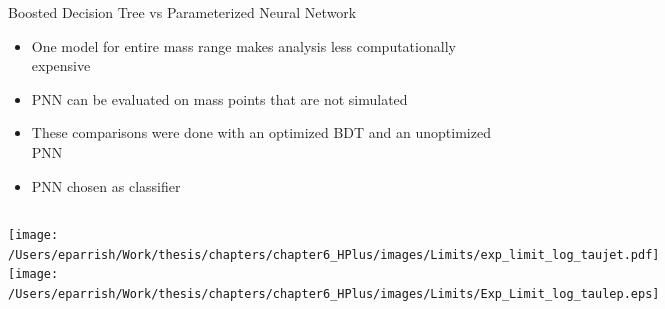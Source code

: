 \documentclass[aspectratio=169,xcolor=table]{beamer}
\begin{document}
    \begin{frame}[t]{Boosted Decision Tree vs Parameterized Neural Network}
      \begin{itemize}
        \item One model for entire mass range makes analysis less computationally expensive
        \item PNN can be evaluated on mass points that are not simulated
        \item These comparisons were done with an optimized BDT and an unoptimized PNN
        \item PNN chosen as classifier
      \end{itemize}
      \begin{columns}
      \centering
      \texttt{[image: /Users/eparrish/Work/thesis/chapters/chapter6\_HPlus/images/Limits/exp\_limit\_log\_taujet.pdf]}
      \centering
      \texttt{[image: /Users/eparrish/Work/thesis/chapters/chapter6\_HPlus/images/Limits/Exp\_Limit\_log\_taulep.eps]}
      \end{columns}
    \end{frame}
\end{document}
